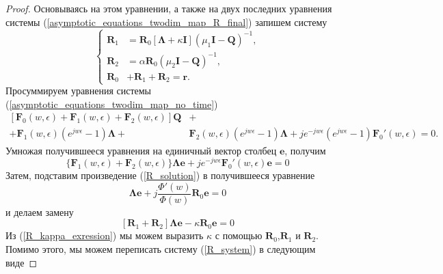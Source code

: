 \begin{proof}
Основываясь на этом уравнении, а также на двух последних уравнения системы (\ref{asymptotic_equations_twodim_map_R_final}) запишем систему
\begin{equation} \label{R_system}
	\left\{
	\begin{aligned}
		\boldsymbol{R}_{1}& = \boldsymbol{R}_{0}[\boldsymbol{\Lambda} + \kappa\boldsymbol{I}](\mu_{1}\boldsymbol{I} - \boldsymbol{Q})^{-1},\\
		\boldsymbol{R}_{2}& = \alpha\boldsymbol{R}_{0}(\mu_2\boldsymbol{I} - \boldsymbol{Q})^{-1},\\
		\boldsymbol{R}_{0}& + \boldsymbol{R}_{1} + \boldsymbol{R}_{2} = \boldsymbol{r}.
	\end{aligned}
	\right.
\end{equation}
Просуммируем уравнения системы (\ref{asymptotic_equations_twodim_map_no_time})
\begin{equation*}
	\begin{split}
		[\boldsymbol{F}_{0}(w,\epsilon) + \boldsymbol{F}_{1}(w,\epsilon) +  \boldsymbol{F}_{2}(w,\epsilon)]\boldsymbol{Q} &+\\  + 
		\boldsymbol{F}_{1}(w,\epsilon)(e^{jw\epsilon} - 1)\boldsymbol{\Lambda} + & \boldsymbol{F}_{2}(w,\epsilon)(e^{jw\epsilon} - 1)\boldsymbol{\Lambda} + je^{-jw\epsilon}(e^{jw\epsilon} - 1)\boldsymbol{F}_{0}'(w,\epsilon) = 0.
	\end{split}
\end{equation*}
Умножая получившееся уравнения на единичный вектор столбец $\boldsymbol{e}$, получим
\begin{equation*}
	\{\boldsymbol{F}_{1}(w,\epsilon) + \boldsymbol{F}_{2}(w,\epsilon)\}\boldsymbol{\Lambda}\boldsymbol{e} + je^{-jw\epsilon}\boldsymbol{F}_{0}'(w,\epsilon)\boldsymbol{e} = 0
\end{equation*}
Затем, подставим произведение (\ref{R_solution}) в получившееся уравнение
\begin{equation*}
	[\boldsymbol{R}_{1} + \boldsymbol{R}_{2}]\boldsymbol{\Lambda}\boldsymbol{e} + j\frac{\Phi'(w)}{\Phi(w)}\boldsymbol{R}_{0}\boldsymbol{e} = 0
\end{equation*}
 и делаем замену
 \begin{equation} \label{R_kappa_exression}
 	[\boldsymbol{R}_{1} + \boldsymbol{R}_{2}]\boldsymbol{\Lambda}\boldsymbol{e} -\kappa\boldsymbol{R}_{0}\boldsymbol{e} = 0
\end{equation}
Из (\ref{R_kappa_exression}) мы можем выразить $\kappa$ с помощью $\boldsymbol{R}_{0}$,$\boldsymbol{R}_{1}$ и $\boldsymbol{R}_{2}$. Помимо этого, мы можем переписать систему (\ref{R_system}) в следующим виде

\end{proof}
